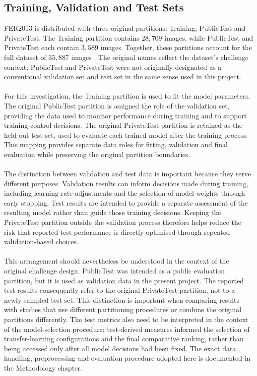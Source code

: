 \documentclass[12pt, a4paper]{report}
\let\oldsubsection\subsection
\renewcommand{\subsection}{%
    \Needspace{6\baselineskip}%
    \oldsubsection
}
\begin{document}
			\subsection{Training, Validation and Test Sets}
				
				FER2013 is distributed with three original partitions: Training, PublicTest and PrivateTest. The Training partition contains $28,709$ images, while PublicTest and PrivateTest each contain $3,589$ images. Together, these partitions account for the full dataset of $35,887$ images \cite{goodfellow2015challenges, fer2013_kaggle}. The original names reflect the dataset's challenge context; PublicTest and PrivateTest were not originally designated as a conventional validation set and test set in the same sense used in this project.\\\\
				For this investigation, the Training partition is used to fit the model parameters. The original PublicTest partition is assigned the role of the validation set, providing the data used to monitor performance during training and to support training-control decisions. The original PrivateTest partition is retained as the held-out test set, used to evaluate each trained model after the training process. This mapping provides separate data roles for fitting, validation and final evaluation while preserving the original partition boundaries.\\\\
				The distinction between validation and test data is important because they serve different purposes. Validation results can inform decisions made during training, including learning-rate adjustments and the selection of model weights through early stopping. Test results are intended to provide a separate assessment of the resulting model rather than guide those training decisions. Keeping the PrivateTest partition outside the validation process therefore helps reduce the risk that reported test performance is directly optimised through repeated validation-based choices.\\\\
				This arrangement should nevertheless be understood in the context of the original challenge design. PublicTest was intended as a public evaluation partition, but it is used as validation data in the present project. The reported test results consequently refer to the original PrivateTest partition, not to a newly sampled test set. This distinction is important when comparing results with studies that use different partitioning procedures or combine the original partitions differently. The test metrics also need to be interpreted in the context of the model-selection procedure: test-derived measures informed the selection of transfer-learning configurations and the final comparative ranking, rather than being accessed only after all model decisions had been fixed. The exact data handling, preprocessing and evaluation procedure adopted here is documented in the Methodology chapter.
				
\end{document}
